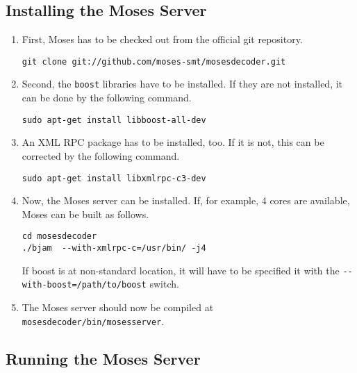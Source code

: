 \subsection{Installing the Moses Server}
\begin{enumerate}
    \item
First, Moses has to be checked out from the official git repository.

\begin{lstlisting}
git clone git://github.com/moses-smt/mosesdecoder.git
\end{lstlisting}

\item
Second, the \texttt{boost} libraries have to be installed. If they are not installed, it can be done by the following command.

\begin{lstlisting}
sudo apt-get install libboost-all-dev
\end{lstlisting}

\item
An XML RPC package has to be installed, too. If it is not, this can be corrected by the following command.

\begin{lstlisting}
sudo apt-get install libxmlrpc-c3-dev
\end{lstlisting}

\item
Now, the Moses server can be installed. If, for example, 4 cores are available, Moses can be built as follows.

\begin{lstlisting}
cd mosesdecoder
./bjam  --with-xmlrpc-c=/usr/bin/ -j4
\end{lstlisting}

If boost is at non-standard location, it will have to be specified it with the \texttt{-{}-with-boost=/path/to/boost} switch.

\item
The Moses server should now be compiled at \texttt{mosesdecoder/bin/mosesserver}.
\end{enumerate}

\subsection{Running the Moses Server}

